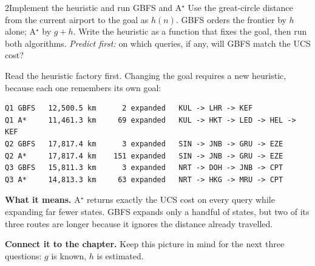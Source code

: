 \begin{labquestion}{2}{Implement the heuristic and run GBFS and A$^\star$}
Use the great-circle distance from the current airport to the goal as $h(n)$. GBFS orders the frontier by $h$ alone; A$^\star$ by $g + h$. Write the heuristic as a function that fixes the goal, then run both algorithms. \emph{Predict first:} on which queries, if any, will GBFS match the UCS cost?
\end{labquestion}
\begin{labanswer}
Read the heuristic factory first. Changing the goal requires a new heuristic, because each one remembers its own goal:



\begin{refoutput}
\begin{lstlisting}[style=utpterminal]
Q1 GBFS   12,500.5 km      2 expanded   KUL -> LHR -> KEF
Q1 A*     11,461.3 km     69 expanded   KUL -> HKT -> LED -> HEL -> KEF
Q2 GBFS   17,817.4 km      3 expanded   SIN -> JNB -> GRU -> EZE
Q2 A*     17,817.4 km    151 expanded   SIN -> JNB -> GRU -> EZE
Q3 GBFS   15,811.3 km      3 expanded   NRT -> DOH -> JNB -> CPT
Q3 A*     14,813.3 km     63 expanded   NRT -> HKG -> MRU -> CPT
\end{lstlisting}
\end{refoutput}

\textbf{What it means.} A$^\star$ returns exactly the UCS cost on every query while expanding far fewer states. GBFS expands only a handful of states, but two of its three routes are longer because it ignores the distance already travelled.
\end{labanswer}

\textbf{Connect it to the chapter.} Keep this picture in mind for the next three questions: $g$ is known, $h$ is estimated.


